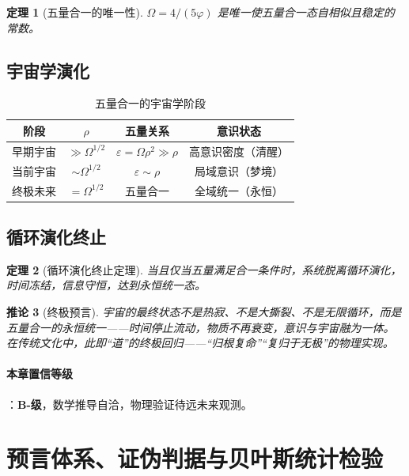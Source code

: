 \documentclass[12pt,a4paper,twocolumn]{article}
\renewcommand{\phi}{\varphi}
\newtheorem{theorem}{定理}[section]
\newtheorem{corollary}[theorem]{推论}
\begin{document}
\begin{theorem}[五量合一的唯一性]
$\Omega = 4/(5\phi)$ 是唯一使五量合一态自相似且稳定的常数。
\end{theorem}

\subsection{宇宙学演化}

\begin{table}[H]
\centering
\footnotesize
\caption{五量合一的宇宙学阶段}
\begin{tabular}{c|c|c|c}
\hline
\textbf{阶段} & $\rho$ & 五量关系 & \textbf{意识状态} \\
\hline
早期宇宙 & $\gg \Omega^{1/2}$ & $\varepsilon = \Omega\rho^2 \gg \rho$ & 高意识密度（清醒） \\
当前宇宙 & $\sim \Omega^{1/2}$ & $\varepsilon \sim \rho$ & 局域意识（梦境） \\
终极未来 & $= \Omega^{1/2}$ & 五量合一 & 全域统一（永恒） \\
\hline
\end{tabular}
\end{table}

\subsection{循环演化终止}

\begin{theorem}[循环演化终止定理]
当且仅当五量满足合一条件时，系统脱离循环演化，时间冻结，信息守恒，达到永恒统一态。
\end{theorem}

\begin{corollary}[终极预言]
宇宙的最终状态不是热寂、不是大撕裂、不是无限循环，而是五量合一的永恒统一——时间停止流动，物质不再衰变，意识与宇宙融为一体。在传统文化中，此即``道''的终极回归——``归根复命''``复归于无极''的物理实现。
\end{corollary}

\paragraph{本章置信等级}：\textbf{B-级}，数学推导自洽，物理验证待远未来观测。

\section{预言体系、证伪判据与贝叶斯统计检验}
\end{document}
